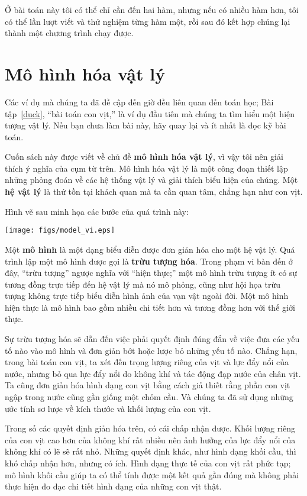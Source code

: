 \documentclass[12pt]{book}
\begin{document}
Ở bài toán này tôi có thể chỉ cần đến hai hàm, nhưng nếu có nhiều hàm hơn,
tôi có thể lần lượt viết và thử nghiệm từng hàm một, rồi sau đó kết hợp 
chúng lại thành một chương trình chạy được.



\section{Mô hình hóa vật lý}
\label{modeling}

Các ví dụ mà chúng ta đã đề cập đến giờ đều liên quan đến toán học;
Bài tập~\ref{duck}, ``bài toán con vịt,'' là ví dụ đầu tiên mà chúng ta
tìm hiểu một hiện tượng vật lý. Nếu bạn chưa làm bài này, hãy quay lại
và ít nhất là đọc kỹ bài toán.

Cuốn sách này được viết về chủ đề {\bf mô hình hóa vật lý}, vì vậy
tôi nên giải thích ý nghĩa của cụm từ trên. Mô hình hóa vật lý là một
công đoạn thiết lập những phỏng đoán về các hệ thống vật lý và 
giải thích biểu hiện của chúng. Một {\bf hệ vật lý} là thứ tồn tại 
khách quan mà ta cần quan tâm, chẳng hạn như con vịt.

Hình vẽ sau minh họa các bước của quá trình này:

\centerline{\texttt{[image: figs/model\_vi.eps]}}

Một {\bf mô hình} là một dạng biểu diễn được đơn giản hóa cho một
hệ vật lý. Quá trình lập một mô hình được gọi là {\bf trừu tượng hóa}.
Trong phạm vi bàn đến ở đây, ``trừu tượng'' ngược nghĩa với ``hiện thực;''
một mô hình trừu tượng ít có sự tương đồng trực tiếp đến hệ vật lý mà
nó mô phỏng, cũng như hội họa trừu tượng không trực tiếp biểu diễn
hình ảnh của vạn vật ngoài đời. Một mô hình hiện thực là mô hình
bao gồm nhiều chi tiết hơn và tương đồng hơn với thế giới thực.

Sự trừu tượng hóa sẽ dẫn đến việc phải quyết định đúng đắn về việc
đưa các yếu tố nào vào mô hình và đơn giản bớt hoặc lược bỏ những
yếu tố nào. Chẳng hạn, trong bài toán con vịt, ta xét đến trọng lượng riêng
của vịt và lực đẩy nổi của nước, nhưng bỏ qua lực đẩy nổi do không khí 
và tác động đạp nước của chân vịt. Ta cũng
đơn giản hóa hình dạng con vịt bằng cách giả thiết rằng phần con vịt
ngập trong nước cũng gần giống một chỏm cầu. Và chúng ta đã sử dụng
những ước tính sơ lược về kích thước và khối lượng của con vịt.

Trong số các quyết định giản hóa trên, có cái chấp nhận được. Khối lượng riêng
của con vịt cao hơn của không khí rất nhiều nên ảnh hưởng của lực đẩy nổi
của không khí có lẽ sẽ rất nhỏ. Những quyết định khác, như hình dạng
khối cầu, thì khó chấp nhận hơn, nhưng có ích. Hình dạng thực tế
của con vịt rất phức tạp; mô hình khối cầu giúp ta có thể tính được
một kết quả gần đúng mà không phải thực hiện đo đạc chi tiết hình dạng
của những con vịt thật.
\end{document}
